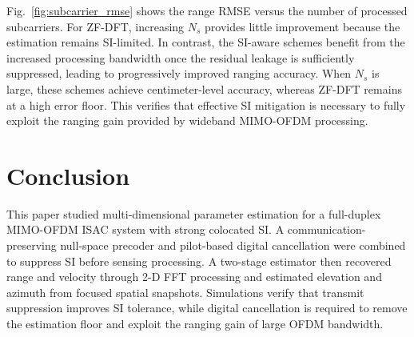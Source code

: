\documentclass[conference]{IEEEtran}
\begin{document}
Fig.~\ref{fig:subcarrier_rmse} shows the range RMSE versus the number of processed subcarriers. For ZF-DFT, increasing $N_s$ provides little improvement because the estimation remains SI-limited. In contrast, the SI-aware schemes benefit from the increased processing bandwidth once the residual leakage is sufficiently suppressed, leading to progressively improved ranging accuracy. When $N_s$ is large, these schemes achieve centimeter-level accuracy, whereas ZF-DFT remains at a high error floor. This verifies that effective SI mitigation is necessary to fully exploit the ranging gain provided by wideband MIMO-OFDM processing.


\section{Conclusion}\label{sec:conclusion}
This paper studied multi-dimensional parameter estimation for a full-duplex MIMO-OFDM ISAC system with strong colocated SI. A communication-preserving null-space precoder and pilot-based digital cancellation were combined to suppress SI before sensing processing. A two-stage estimator then recovered range and velocity through 2-D FFT processing and estimated elevation and azimuth from focused spatial snapshots. Simulations verify that transmit suppression improves SI tolerance, while digital cancellation is required to remove the estimation floor and exploit the ranging gain of large OFDM bandwidth.



\end{document}
